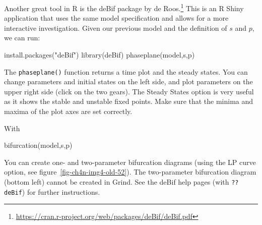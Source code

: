 \documentclass[
  a4paper,
  DIV=11,
  numbers=noendperiod,
  oneside]{scrreprt}
\newenvironment{Shaded}{}{}
\newcommand{\FunctionTok}[1]{\textcolor[rgb]{0.44,0.26,0.76}{#1}}
\newcommand{\NormalTok}[1]{\textcolor[rgb]{0.14,0.16,0.18}{#1}}
\newcommand{\StringTok}[1]{\textcolor[rgb]{0.01,0.18,0.38}{#1}}
\begin{document}
Another great tool in R is the deBif package by de Roos.\footnote{\url{https://cran.r-project.org/web/packages/deBif/deBif.pdf}}
This is an R Shiny application that uses the same model specification
and allows for a more interactive investigation. Given our previous
model and the definition of \(s\) and \(p\), we can run:

\begin{Shaded}
\begin{Highlighting}[]
\FunctionTok{install.packages}\NormalTok{(}\StringTok{"deBif"}\NormalTok{)}
\FunctionTok{library}\NormalTok{(deBif)}
\FunctionTok{phaseplane}\NormalTok{(model,s,p)}
\end{Highlighting}
\end{Shaded}

The \texttt{phaseplane()} function returns a time plot and the steady
states. You can change parameters and initial states on the left side,
and plot parameters on the upper right side (click on the two gears).
The Steady States option is very useful as it shows the stable and
unstable fixed points. Make sure that the minima and maxima of the plot
axes are set correctly.

With

\begin{Shaded}
\begin{Highlighting}[]
\FunctionTok{bifurcation}\NormalTok{(model,s,p)}
\end{Highlighting}
\end{Shaded}

You can create one- and two-parameter bifurcation diagrams (using the LP
curve option, see figure~\ref{fig-ch4n-img4-old-52}). The two-parameter
bifurcation diagram (bottom left) cannot be created in Grind. See the
deBif help pages (with \texttt{??deBif}) for further instructions.
\end{document}
